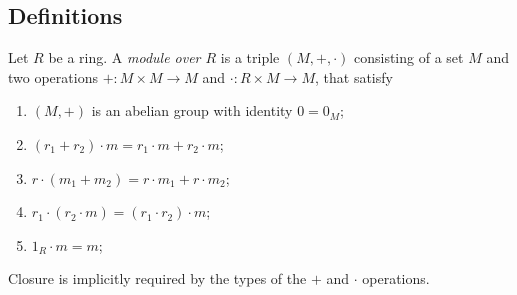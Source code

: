 \subsection{Definitions}
\begin{definition}
	Let $R$ be a ring.
	A \textit{module over $R$} is a triple $(M, +, \cdot)$ consisting of a set $M$ and two operations $+ \colon M \times M \to M$ and $\cdot \colon R \times M \to M$, that satisfy
	\begin{enumerate}
		\item $(M, +)$ is an abelian group with identity $0 = 0_M$;
		\item $(r_1 + r_2) \cdot m = r_1 \cdot m + r_2 \cdot m$;
		\item $r \cdot (m_1 + m_2) = r \cdot m_1 + r \cdot m_2$;
		\item $r_1 \cdot (r_2 \cdot m) = (r_1 \cdot r_2) \cdot m$;
		\item $1_R \cdot m = m$;
	\end{enumerate}
\end{definition}
\begin{remark}
	Closure is implicitly required by the types of the $+$ and $\cdot$ operations.
\end{remark}
